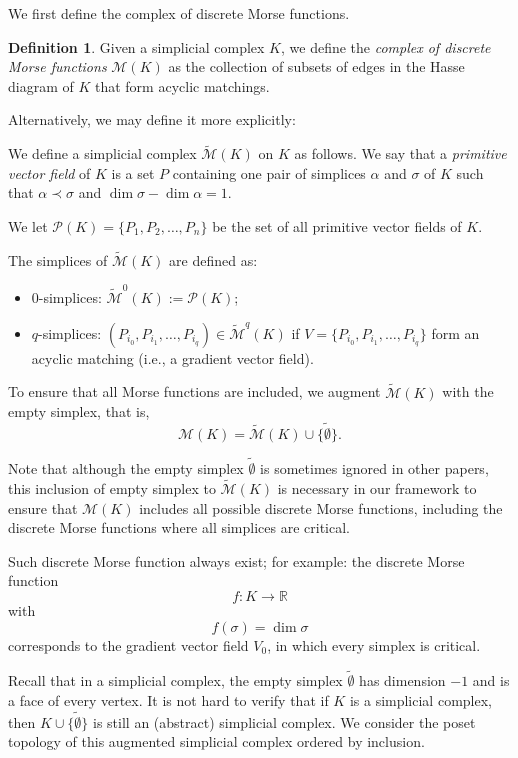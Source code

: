 \documentclass[a4paper,12pt,notitlepage]{amsart}
\theoremstyle{definition}%
\theoremstyle{definition}%
\theoremstyle{definition}%
\newtheorem{definition}[theorem]{Definition}
\newcommand{\M}{\mathcal{M}}
\newcommand{\R}{\mathbb{R}}
\newcommand{\es}{\tilde{\emptyset}}
\newcommand{\MMK}{\widetilde{\mathcal{M}} (K)}
\begin{document}
We first define the complex of discrete Morse functions.
\begin{definition}
Given a simplicial complex $K$,
we define the \textit{complex of discrete Morse functions} $\mathcal{M}(K)$
as the collection of subsets of edges in the Hasse diagram 
of $K$ that form acyclic matchings.

Alternatively, we may define it more explicitly:

We define a simplicial complex   $\MMK$
on $K$ as follows.
We say that a \textit{primitive vector field} of $K$
is a set  $P$ containing one  pair of simplices 
$\alpha$  and  $\sigma$ of $K$ such that 
$\alpha \prec \sigma$ and $\dim \sigma- \dim \alpha= 1$.

We let $\mathcal{P}(K)= \{P_1, P_2, \ldots, P_n  \}$ 
be the set of all primitive vector fields of $K$.

The simplices of $\MMK$ are defined as:
\begin{itemize}
\item  $0$-simplices: $\widetilde{\mathcal{M}}^0(K):= \mathcal{P}(K)$;
\item  $q$-simplices: $( P_{i_0}, P_{i_1}, \ldots, P_{i_q} )\in 
 \widetilde{\mathcal{M}}^q(K)$
if $V= \{ P_{i_0}, P_{i_1}, \ldots, P_{i_q} \}$ 
form an acyclic matching (i.e., a gradient vector field).


\end{itemize}

To ensure that all Morse functions are included, we augment
$\MMK$ with the empty simplex,
that is,
$$\mathcal{M}(K)= \MMK \cup \{\es\}.$$ 


\end{definition}

Note that although the empty simplex $\es$ is sometimes ignored in other papers,
this inclusion of empty simplex to $\MMK$  is 
necessary in our framework to ensure that $\M(K)$ includes all possible discrete 
Morse functions, including the discrete Morse functions where all simplices are critical.

Such discrete Morse function always exist;
for example:
the discrete Morse function
$$f: K\to \R$$
with 
$$f(\sigma)=\dim \sigma$$
corresponds to  the gradient vector field $V_0$,  in which every simplex
is critical.




Recall that in a simplicial complex,
the empty simplex $\es$
has dimension $-1$
and is a face of every vertex.
It is not hard to verify that 
if $K$ is a simplicial complex, then $K \cup \{\es\}$  is still an (abstract) simplicial complex.
We consider the poset topology of this augmented simplicial complex ordered by inclusion.
\end{document}
